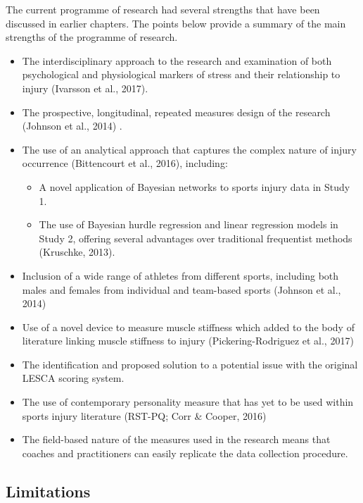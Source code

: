 \documentclass[
  english,
  man,floatsintext]{apa6}
\providecommand{\tightlist}{%
  \setlength{\itemsep}{0pt}\setlength{\parskip}{0pt}}
\begin{document}
The current programme of research had several strengths that have been discussed in earlier chapters.
The points below provide a summary of the main strengths of the programme of research.

\begin{itemize}
\item
  The interdisciplinary approach to the research and examination of both psychological and physiological markers of stress and their relationship to injury (Ivarsson et al., 2017).
\item
  The prospective, longitudinal, repeated measures design of the research (Johnson et al., 2014) .
\item
  The use of an analytical approach that captures the complex nature of injury occurrence (Bittencourt et al., 2016), including:

  \begin{itemize}
  \tightlist
  \item
    A novel application of Bayesian networks to sports injury data in Study 1.
  \item
    The use of Bayesian hurdle regression and linear regression models in Study 2, offering several advantages over traditional frequentist methods (Kruschke, 2013).
  \end{itemize}
\item
  Inclusion of a wide range of athletes from different sports, including both males and females from individual and team-based sports (Johnson et al., 2014)
\item
  Use of a novel device to measure muscle stiffness which added to the body of literature linking muscle stiffness to injury (Pickering-Rodriguez et al., 2017)
\item
  The identification and proposed solution to a potential issue with the original LESCA scoring system.
\item
  The use of contemporary personality measure that has yet to be used within sports injury literature (RST-PQ; Corr \& Cooper, 2016)
\item
  The field-based nature of the measures used in the research means that coaches and practitioners can easily replicate the data collection procedure.
\end{itemize}

\hypertarget{limitations}{%
\subsection{Limitations}\label{limitations}}
\end{document}
